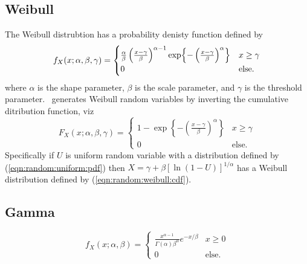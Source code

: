 \subsection{Weibull}
\label{module:random:weibull}
The Weibull distrubtion has a probability denisty function defined by
%
\begin{equation}
\label{eqn:random:weibull:pdf}
    f_X(x;\alpha,\beta,\gamma) =
    \begin{cases}
        \frac{\alpha}{\beta}
        \left(
            \frac{x-\gamma}{\beta}
        \right)^{\alpha-1}
        \exp\Bigl\{
            -\left( \frac{x-\gamma}{\beta} \right)^\alpha
        \Bigr\}                         & \text{$x \ge \gamma$} \\
        0                               & \text{else}.
    \end{cases}
\end{equation}
%
where
$\alpha$ is the shape parameter,
$\beta$ is the scale parameter,
and
$\gamma$ is the threshold parameter.
%
\liquid\ generates Weibull random variables by inverting the cumulative
ditribution function, viz
%
\begin{equation}
\label{eqn:random:weibull:cdf}
    F_X(x;\alpha,\beta,\gamma) =
    \begin{cases}
        1 - \exp\left\{
            -\left(\frac{x-\gamma}{\beta}\right)^\alpha
        \right\} &                            x \ge \gamma \\
        0 &                                   \text{else}.
    \end{cases}
\end{equation}
%
Specifically if $U$ is uniform random variable with a distribution
defined by (\ref{eqn:random:uniform:pdf}) then
$X = \gamma + \beta\left[ \ln\left(1 - U\right) \right]^{1/\alpha}$
%
has a Weibull distribution defined by (\ref{eqn:random:weibull:cdf}).


% 
%
\subsection{Gamma}
\label{module:random:gamma}
%
\begin{equation}
\label{eqn:random:gamma:pdf}
    f_X(x;\alpha,\beta) =
    \begin{cases}
        \frac{
            x^{\alpha-1}
        }{
            \Gamma(\alpha) \beta^\alpha
        }
        e^{-x / \beta}                  & x \ge 0 \\
        0                               & \text{else}.
    \end{cases}
\end{equation}
%


